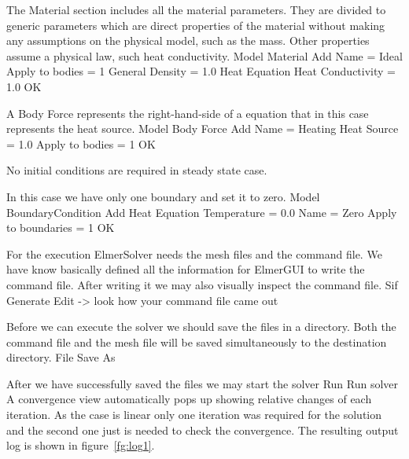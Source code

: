 The Material section includes all the material parameters.
They are divided to generic parameters which are direct properties of the material
without making any assumptions on the physical model, such as the mass. Other properties assume
a physical law, such heat conductivity.
\ttbegin
Model
  Material
    Add 
      Name = Ideal
      Apply to bodies = 1 
      General    
        Density = 1.0
      Heat Equation
        Heat Conductivity = 1.0
    OK
\ttend

A Body Force represents the right-hand-side of a equation that in this case represents
the heat source. 
\ttbegin
Model
  Body Force
    Add 
      Name = Heating
      Heat Source = 1.0
      Apply to bodies = 1
    OK
\ttend    

No initial conditions are required in steady state case.

In this case we have only one boundary and set it to zero.
\ttbegin
Model
  BoundaryCondition
    Add 
      Heat Equation
        Temperature = 0.0
      Name = Zero
      Apply to boundaries = 1
    OK
\ttend   


For the execution 
ElmerSolver needs the mesh files and the command file. We have know basically defined
all the information for ElmerGUI to write the command file. After writing it we may also visually 
inspect the command file.
\ttbegin
Sif 
  Generate
  Edit -> look how your command file came out  
\ttend

Before we can execute the solver we should save the files in a directory. Both the command file and
the mesh file will be saved simultaneously to the destination directory.
\ttbegin
File 
  Save As
\ttend

After we have successfully saved the files we may start the solver
\ttbegin
Run
  Run solver
\ttend
A convergence view automatically pops up showing relative changes of each iteration.
As the case is linear only one iteration was required for the solution and the second one
just is needed to check the convergence. 
The resulting output log is shown in figure~\ref{fg:log1}.

